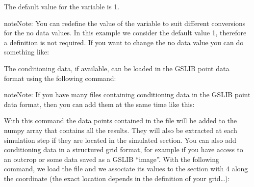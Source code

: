 \documentclass[letterpaper,10pt,english]{sphinxmanual}
\begin{document}
The default value for the variable  is \sphinxhyphen{}1.

\begin{sphinxadmonition}{note}{Note:}
You can redefine the value of the variable  to
suit different conversions for the no data values.
In this example we consider the default value \sphinxhyphen{}1, therefore a
definition is not required.
If you want to change the no data value you can do something like:

\begin{sphinxVerbatim}[commandchars=\\\{\}]
  
\end{sphinxVerbatim}
\end{sphinxadmonition}

The conditioning data, if available, can be loaded in the GSLIB point
data format using the following command:

\begin{sphinxVerbatim}[commandchars=\\\{\}]
\PYG{p}{[}\PYG{p}{]}  
\end{sphinxVerbatim}

\begin{sphinxadmonition}{note}{Note:}
If you have many files containing conditioning data in the
GSLIB point data format, then you can add them at the same time
like this:

\begin{sphinxVerbatim}[commandchars=\\\{\}]
\PYG{p}{[}
    \PYG{p}{]}  
\end{sphinxVerbatim}
\end{sphinxadmonition}

With this command the data points contained in the file
 will be added to the numpy array that contains
all the results. They will also be extracted at each simulation step
if they are located in the simulated section.  You can also add
conditioning data in a structured grid format, for example if you have
access to an outcrop or some data saved as a GSLIB “image”.  With the
following command, we load the file  and we
associate its values to the section with  4 along the 
coordinate (the exact location depends in the definition of your
grid…):
\end{document}
